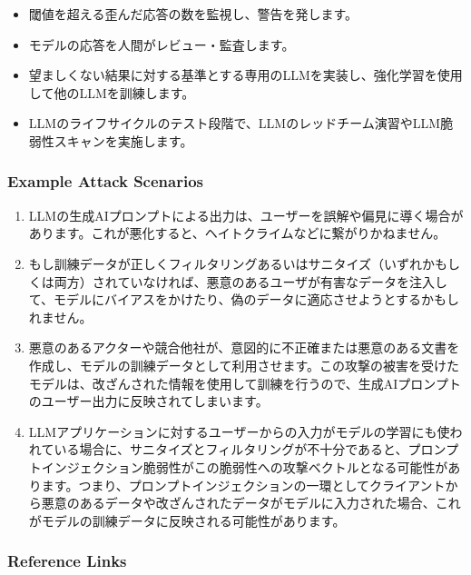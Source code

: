 \documentclass[
]{article}
\begin{document}
\begin{itemize}
\item
  閾値を超える歪んだ応答の数を監視し、警告を発します。
\item
  モデルの応答を人間がレビュー・監査します。
\item
  望ましくない結果に対する基準とする専用のLLMを実装し、強化学習を使用して他のLLMを訓練します。
\item
  LLMのライフサイクルのテスト段階で、LLMのレッドチーム演習やLLM脆弱性スキャンを実施します。
\end{itemize}

\subsubsection{Example Attack Scenarios}\label{example-attack-scenarios}

\begin{enumerate}
\def\labelenumi{\arabic{enumi}.}
\item
  LLMの生成AIプロンプトによる出力は、ユーザーを誤解や偏見に導く場合があります。これが悪化すると、ヘイトクライムなどに繋がりかねません。
\item
  もし訓練データが正しくフィルタリングあるいはサニタイズ（いずれかもしくは両方）されていなければ、悪意のあるユーザが有害なデータを注入して、モデルにバイアスをかけたり、偽のデータに適応させようとするかもしれません。
\item
  悪意のあるアクターや競合他社が、意図的に不正確または悪意のある文書を作成し、モデルの訓練データとして利用させます。この攻撃の被害を受けたモデルは、改ざんされた情報を使用して訓練を行うので、生成AIプロンプトのユーザー出力に反映されてしまいます。
\item
  LLMアプリケーションに対するユーザーからの入力がモデルの学習にも使われている場合に、サニタイズとフィルタリングが不十分であると、プロンプトインジェクション脆弱性がこの脆弱性への攻撃ベクトルとなる可能性があります。つまり、プロンプトインジェクションの一環としてクライアントから悪意のあるデータや改ざんされたデータがモデルに入力された場合、これがモデルの訓練データに反映される可能性があります。
\end{enumerate}

\subsubsection{Reference Links}\label{reference-links}
\end{document}
